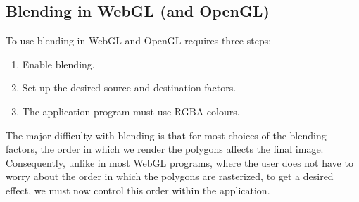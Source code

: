 \documentclass[../COS3712_Notes.tex]{subfiles}
\begin{document}
      \subsection{Blending in WebGL (and OpenGL)}
        To use blending in WebGL and OpenGL requires three steps:
        \begin{enumerate}
          \item Enable blending.
          \item Set up the desired source and destination factors.
          \item The application program must use RGBA colours.
        \end{enumerate}

        The major difficulty with blending is that for most choices of the blending factors,
        the order in which we render the polygons affects the final image.
        Consequently, unlike in most WebGL programs, where the user does not have to worry
        about the order in which the polygons are rasterized, to get a desired effect,
        we must now control this order within the application.
\end{document}
